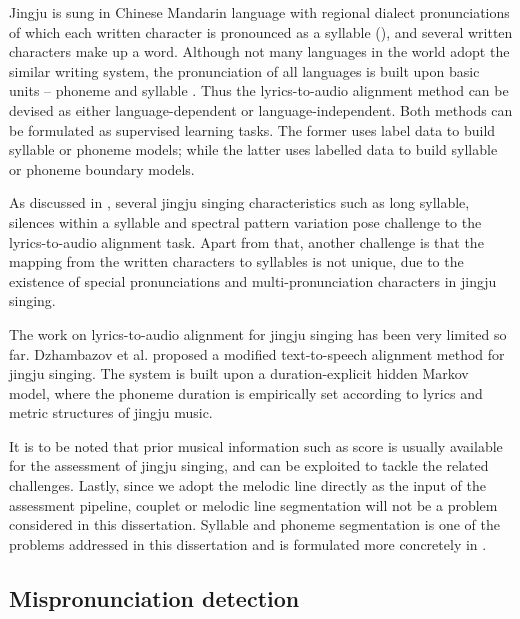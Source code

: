 Jingju is sung in Chinese Mandarin language with regional dialect pronunciations of which each written character is pronounced as a syllable (), and several written characters make up a word. Although not many languages in the world adopt the similar writing system, the pronunciation of all languages is built upon basic units -- phoneme and syllable \cite{Moran2014}. Thus the lyrics-to-audio alignment method can be devised as either language-dependent or language-independent. Both methods can be formulated as supervised learning tasks. The former uses label data to build syllable or phoneme models; while the latter uses labelled data to build syllable or phoneme boundary models.

As discussed in , several jingju singing characteristics such as long syllable, silences within a syllable and spectral pattern variation pose challenge to the lyrics-to-audio alignment task. Apart from that, another challenge is that the mapping from the written characters to syllables is not unique, due to the existence of special pronunciations and multi-pronunciation characters in jingju singing.

The work on lyrics-to-audio alignment for jingju singing has been very limited so far. Dzhambazov et al. \cite{dzhambazov_modeling_2015} proposed a modified text-to-speech alignment method for jingju singing. The system is built upon a duration-explicit hidden Markov model, where the phoneme duration is empirically set according to lyrics and metric structures of jingju music.

It is to be noted that prior musical information such as score is usually available for the assessment of jingju singing, and can be exploited to tackle the related challenges. Lastly, since we adopt the melodic line directly as the input of the assessment pipeline, couplet or melodic line segmentation will not be a problem considered in this dissertation. Syllable and phoneme segmentation is one of the problems addressed in this dissertation and is formulated more concretely in .

\subsection{Mispronunciation detection}\label{sec:ch3:mispronunciation_challenge}

